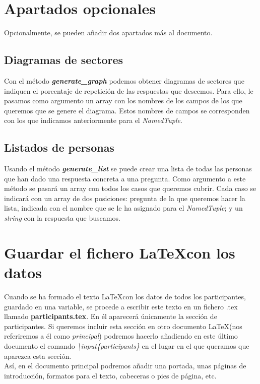 \documentclass[a4paper, 12pt]{book}
\begin{document}
\section{Apartados opcionales}
\label{sec:opcional}
Opcionalmente, se pueden añadir dos apartados más al documento.

\subsection{Diagramas de sectores}
\label{subsec:diagramas}
Con el método \textbf{\textit{generate\_graph}} podemos obtener diagramas de sectores que indiquen el porcentaje de repetición de las respuestas que deseemos. Para ello, le pasamos como argumento un array con los nombres de los campos de los que queremos que se genere el diagrama. Estos nombres de campos se corresponden con los que indicamos anteriormente para el \textit{NamedTuple}.

\subsection{Listados de personas}
\label{subsec:listados}
Usando el método \textbf{\textit{generate\_list}} se puede crear una lista de todas las personas que han dado una respuesta concreta a una pregunta. Como argumento a este método se pasará un array con todos los casos que queremos cubrir. Cada caso se indicará con un array de dos posiciones: pregunta de la que queremos hacer la lista, indicada con el nombre que se le ha asignado para el \textit{NamedTuple}; y un \textit{string} con la respuesta que buscamos.\\


\section{Guardar el fichero \LaTeX con los datos}
\label{sec:guardaLatex}
Cuando se ha formado el texto \LaTeX con los datos de todos los participantes, guardado en una variable, se procede a escribir este texto en un fichero .tex llamado \textbf{participants.tex}. En él aparecerá únicamente la sección de participantes. Si queremos incluir esta sección en otro documento \LaTeX (nos referiremos a él como \textit{principal}) podremos hacerlo añadiendo en este último documento el comando \mbox{\textit{\textbackslash input\{participants\}}} en el lugar en el que queramos que aparezca esta sección.\\

Así, en el documento principal podremos añadir una portada, unas páginas de introducción, formatos para el texto, cabeceras o pies de página, etc.\\
\end{document}
